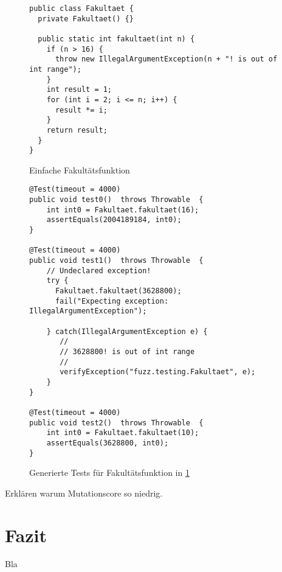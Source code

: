 \documentclass[a4paper,11pt]{article}
\begin{document}
\begin{figure}[h]
	\begin{lstlisting}[basicstyle=\ttfamily\tiny]
public class Fakultaet {
  private Fakultaet() {}

  public static int fakultaet(int n) {
    if (n > 16) {
      throw new IllegalArgumentException(n + "! is out of int range");
    }
    int result = 1;
    for (int i = 2; i <= n; i++) {
      result *= i;
    }
    return result;
  }
}
	\end{lstlisting}
	\caption{Einfache Fakultätsfunktion}
	\label{fig:fakultaet}
\end{figure}

\begin{figure}
	\begin{lstlisting}[basicstyle=\ttfamily\tiny]
@Test(timeout = 4000)
public void test0()  throws Throwable  {
    int int0 = Fakultaet.fakultaet(16);
    assertEquals(2004189184, int0);
}

@Test(timeout = 4000)
public void test1()  throws Throwable  {
    // Undeclared exception!
    try { 
      Fakultaet.fakultaet(3628800);
      fail("Expecting exception: IllegalArgumentException");
    
    } catch(IllegalArgumentException e) {
       //
       // 3628800! is out of int range
       //
       verifyException("fuzz.testing.Fakultaet", e);
    }
}

@Test(timeout = 4000)
public void test2()  throws Throwable  {
    int int0 = Fakultaet.fakultaet(10);
    assertEquals(3628800, int0);
}
	\end{lstlisting}
	\caption{Generierte Tests für Fakultätsfunktion in \cref{fig:fakultaet}}
	\label{fig:fakultaet_tests}
\end{figure}

Erklären warum Mutationscore so niedrig.

\section{Fazit}

Bla



\end{document}
